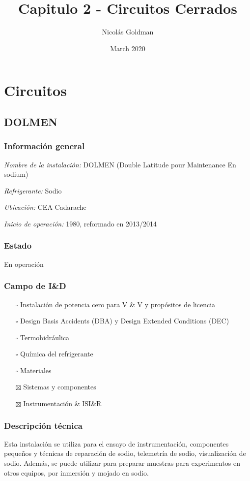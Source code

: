 \documentclass{article}
\title{Capitulo 2 - Circuitos Cerrados}
\author{Nicolás Goldman}
\date{March 2020}
\begin{document}
\maketitle

\section{Circuitos}
\subsection{DOLMEN}
\subsubsection*{Información general}
\textit{Nombre de la instalación: }DOLMEN (Double Latitude pour Maintenance En sodium)

\textit{Refrigerante: }Sodio

\textit{Ubicación: }CEA Cadarache

\textit{Inicio de operación: }1980, reformado en 2013/2014

\subsubsection*{Estado}
En operación

\subsubsection*{Campo de I\&D}
\begin{itemize}
\item[$\square$] Instalación de potencia cero para V \& V y propósitos de licencia
\item[$\square$] Design Basis Accidents (DBA) y Design Extended Conditions (DEC)
\item[$\square$] Termohidráulica
\item[$\square$] Química del refrigerante
\item[$\square$] Materiales
\item[$\boxtimes$] Sistemas y componentes
\item[$\boxtimes$] Instrumentación \& ISI\&R
\end{itemize}
\subsubsection*{Descripción técnica}
Esta instalación se utiliza para el ensayo de instrumentación, componentes pequeños y técnicas de reparación de sodio, telemetría de sodio, visualización de sodio. Además, se puede utilizar para preparar muestras para experimentos en otros equipos, por inmersión y mojado en sodio.
\end{document}
